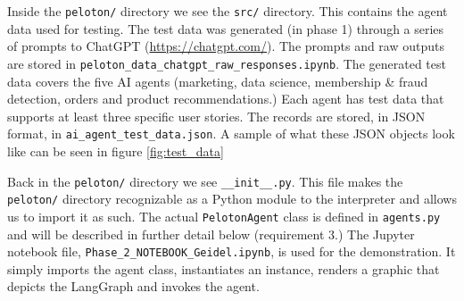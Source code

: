 \documentclass[11pt,letterpaper]{article}
\begin{document}
Inside the \texttt{peloton/} directory we see the \texttt{src/} directory. This contains the agent data used for testing. 
The test data was generated (in phase 1) through a series of prompts to ChatGPT (\url{https://chatgpt.com/}). 
The prompts and raw outputs are stored in \texttt{peloton\_data\_chatgpt\_raw\_responses.ipynb}.
The generated test data covers the five AI agents (marketing, data science, membership \& fraud detection, orders and product recommendations.)
Each agent has test data that supports at least three specific user stories. The records are stored, in JSON format, in \texttt{ai\_agent\_test\_data.json}.
A sample of what these JSON objects look like can be seen in figure \ref{fig:test_data}

Back in the \texttt{peloton/} directory we see \texttt{\_\_init\_\_.py}. This file makes the \texttt{peloton/} directory recognizable as a Python module to the interpreter and allows us to import it as such. The actual \texttt{PelotonAgent} class is defined in \texttt{agents.py} and will be described in further detail below (requirement 3.) The Jupyter notebook file, \texttt{Phase\_2\_NOTEBOOK\_Geidel.ipynb}, is used for the demonstration. It simply imports the agent class, instantiates an instance, renders a graphic that depicts the LangGraph and invokes the agent.

\clearpage
\end{document}

